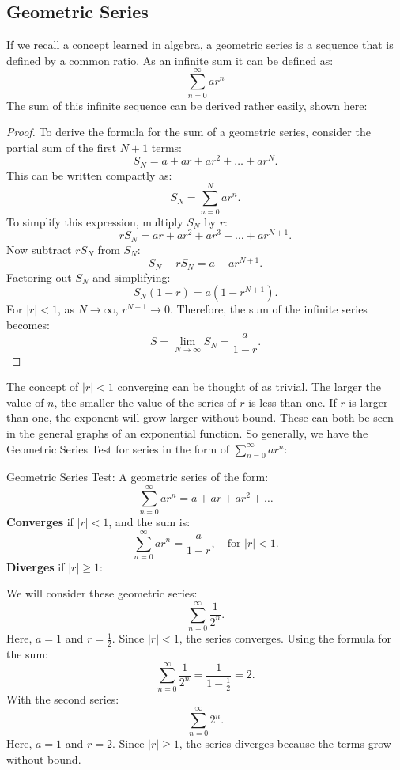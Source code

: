 \documentclass[a4paper, 11pt]{article}
\newenvironment{concept}{%
    \vspace{1em}
    \begin{tcolorbox}[colframe=black!70, colback=white!95, title=Definition]
}{%
    \end{tcolorbox}
    \vspace{1em}
}
\begin{document}
\subsection{Geometric Series}
If we recall a concept learned in algebra, a geometric series is a sequence that is defined by a common ratio. As an infinite sum it can be defined as: 
\[\sum_{n=0}^\infty ar^n\]
The sum of this infinite sequence can be derived rather easily, shown here:
\begin{proof}
To derive the formula for the sum of a geometric series, consider the partial sum of the first \(N+1\) terms:
\[S_N = a + ar + ar^2 + \dots + ar^N.\]
This can be written compactly as:
\[S_N = \sum_{n=0}^N ar^n.\]
To simplify this expression, multiply \(S_N\) by \(r\):
\[rS_N = ar + ar^2 + ar^3 + \dots + ar^{N+1}.\]
Now subtract \(rS_N\) from \(S_N\):
\[S_N - rS_N = a - ar^{N+1}.\]
Factoring out \(S_N\) and simplifying:
\[S_N(1 - r) = a(1 - r^{N+1}).\]
For \(|r| < 1\), as \(N \to \infty\), \(r^{N+1} \to 0\). Therefore, the sum of the infinite series becomes:
\[S = \lim_{N \to \infty} S_N = \frac{a}{1 - r}.\]
\end{proof}
The concept of \(|r| < 1\) converging can be thought of as trivial. The larger the value of $n$, the smaller the value of the series of $r$ is less than one. If $r$ is larger than one, the exponent will grow larger without bound. These can both be seen in the general graphs of an exponential function. So generally, we have the Geometric Series Test for series in the form of \(\sum_{n=0}^\infty ar^n\):
\begin{concept}{Geometric Series Test:}
A geometric series of the form:
\[\sum_{n=0}^\infty ar^n = a + ar + ar^2 + \dots\]
\textbf{Converges} if \( |r| < 1 \), and the sum is:
\[\sum_{n=0}^\infty ar^n = \frac{a}{1 - r}, \quad \text{for } |r| < 1.\]
\textbf{Diverges} if \( |r| \geq 1 \): 
\end{concept}
We will consider these geometric series:
\[\sum_{n=0}^\infty \frac{1}{2^n}.\]
Here, \(a = 1\) and \(r = \frac{1}{2}\). Since \(|r| < 1\), the series converges. Using the formula for the sum:
\[\sum_{n=0}^\infty \frac{1}{2^n} = \frac{1}{1 - \frac{1}{2}} = 2.\]
With the second series: 
\[\sum_{n=0}^\infty 2^n.\]
Here, \(a = 1\) and \(r = 2\). Since \(|r| \geq 1\), the series diverges because the terms grow without bound.
\end{document}
